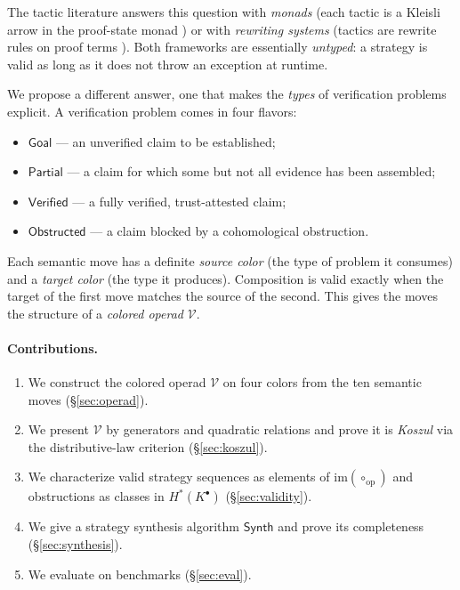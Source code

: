 \documentclass[11pt]{article}
\newcommand{\Vop}{\mathcal{V}}           %
\newcommand{\Kcom}{K^{\bullet}}          %
\newcommand{\opcomp}{\circ_{\mathrm{op}}}%
\newcommand{\synthAlg}{\mathsf{Synth}}  %
\newcommand{\partialPrf}{\mathsf{Partial}} %
\newcommand{\goalCol}{\mathsf{Goal}}      %
\newcommand{\verifCol}{\mathsf{Verified}} %
\newcommand{\obstCol}{\mathsf{Obstructed}}%
\newcommand{\im}{\mathrm{im}}            %
\begin{document}
The tactic literature answers this question with \emph{monads}
(each tactic is a Kleisli arrow in the proof-state monad
\cite{deMoura2021Lean4}) or with \emph{rewriting systems}
(tactics are rewrite rules on proof terms \cite{Avigad2023Hitchhiker}).
Both frameworks are essentially \emph{untyped}: a strategy is valid as
long as it does not throw an exception at runtime.

We propose a different answer, one that makes the \emph{types} of
verification problems explicit.  A verification problem comes in four
flavors:
\begin{itemize}[nosep]
\item $\goalCol$ --- an unverified claim to be established;
\item $\partialPrf$ --- a claim for which some but not all evidence
  has been assembled;
\item $\verifCol$ --- a fully verified, trust-attested claim;
\item $\obstCol$ --- a claim blocked by a cohomological obstruction.
\end{itemize}
Each semantic move has a definite \emph{source color} (the type of
problem it consumes) and a \emph{target color} (the type it produces).
Composition is valid exactly when the target of the first move matches
the source of the second.  This gives the moves the structure of a
\emph{colored operad} $\Vop$.

\paragraph{Contributions.}
\begin{enumerate}[label=(\arabic*),nosep]
\item We construct the colored operad $\Vop$ on four colors from the
  ten semantic moves (\S\ref{sec:operad}).
\item We present $\Vop$ by generators and quadratic relations and prove
  it is \emph{Koszul} via the distributive-law criterion
  (\S\ref{sec:koszul}).
\item We characterize valid strategy sequences as elements of
  $\im(\opcomp)$ and obstructions as classes in $H^*(\Kcom)$
  (\S\ref{sec:validity}).
\item We give a strategy synthesis algorithm $\synthAlg$ and prove its
  completeness (\S\ref{sec:synthesis}).
\item We evaluate on \numcases{} benchmarks (\S\ref{sec:eval}).
\end{enumerate}
\end{document}
